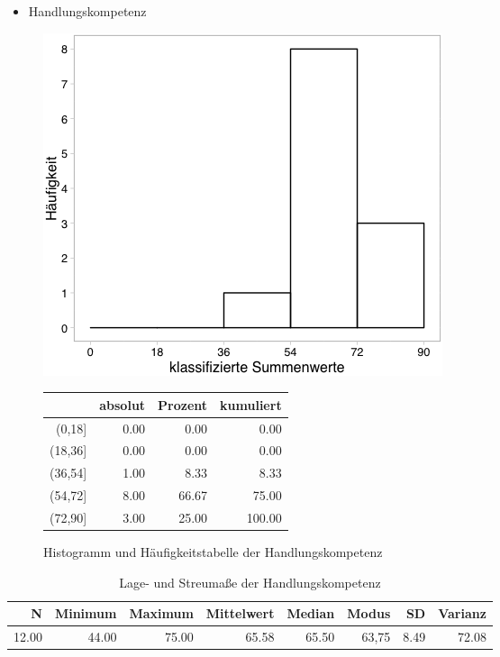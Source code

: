 \documentclass[12pt, bibliography=totoc]{scrartcl}
\begin{document}
\begin{itemize}
\tightlist
\item
  Handlungskompetenz
\end{itemize}

\begin{figure}[H]
\begin{minipage}{.5\linewidth}
\includegraphics[width=0.8\linewidth]{Anhang/HKHistnn.png}

\label{pic:aufbau}
\end{minipage}
\begin{minipage}{.5\linewidth}
\centering
\raisebox{\depth}
{\begin{tabular}{rrrr}
  \hline
 & absolut & Prozent & kumuliert \\ 
  \hline
(0,18] & 0.00 & 0.00 & 0.00 \\ 
  (18,36] & 0.00 & 0.00 & 0.00 \\ 
  (36,54] & 1.00 & 8.33 & 8.33 \\ 
  (54,72] & 8.00 & 66.67 & 75.00 \\ 
  (72,90] & 3.00 & 25.00 & 100.00 \\ 
   \hline
\end{tabular}

}
\label{tab:defis}
\end{minipage}
\caption{Histogramm und Häufigkeitstabelle der Handlungskompetenz}
\end{figure}

\begin{table}[H]
\centering
\caption{Lage- und Streumaße der Handlungskompetenz}
\begin{tabular}{rrrrrrrr}
  \hline
  N & Minimum & Maximum & Mittelwert & Median & Modus & SD & Varianz \\
  \hline
12.00 & 44.00 & 75.00 & 65.58 & 65.50 & 63,75 & 8.49 & 72.08 \\
   \hline
\end{tabular}
\end{table}
\end{document}
